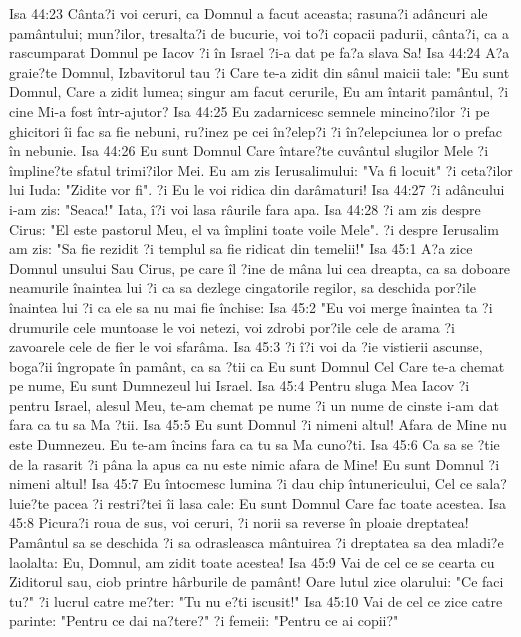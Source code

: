 Isa 44:23  Cânta?i voi ceruri, ca Domnul a facut aceasta; rasuna?i adâncuri ale pamântului; mun?ilor, tresalta?i de bucurie, voi to?i copacii padurii, cânta?i, ca a rascumparat Domnul pe Iacov ?i în Israel ?i-a dat pe fa?a slava Sa!
Isa 44:24  A?a graie?te Domnul, Izbavitorul tau ?i Care te-a zidit din sânul maicii tale: "Eu sunt Domnul, Care a zidit lumea; singur am facut cerurile, Eu am întarit pamântul, ?i cine Mi-a fost într-ajutor?
Isa 44:25  Eu zadarnicesc semnele mincino?ilor ?i pe ghicitori îi fac sa fie nebuni, ru?inez pe cei în?elep?i ?i în?elepciunea lor o prefac în nebunie.
Isa 44:26  Eu sunt Domnul Care întare?te cuvântul slugilor Mele ?i împline?te sfatul trimi?ilor Mei. Eu am zis Ierusalimului: "Va fi locuit" ?i ceta?ilor lui Iuda: "Zidite vor fi". ?i Eu le voi ridica din darâmaturi!
Isa 44:27  ?i adâncului i-am zis: "Seaca!" Iata, î?i voi lasa râurile fara apa.
Isa 44:28  ?i am zis despre Cirus: "El este pastorul Meu, el va împlini toate voile Mele". ?i despre Ierusalim am zis: "Sa fie rezidit ?i templul sa fie ridicat din temelii!"
Isa 45:1  A?a zice Domnul unsului Sau Cirus, pe care îl ?ine de mâna lui cea dreapta, ca sa doboare neamurile înaintea lui ?i ca sa dezlege cingatorile regilor, sa deschida por?ile înaintea lui ?i ca ele sa nu mai fie închise:
Isa 45:2  "Eu voi merge înaintea ta ?i drumurile cele muntoase le voi netezi, voi zdrobi por?ile cele de arama ?i zavoarele cele de fier le voi sfarâma.
Isa 45:3  ?i î?i voi da ?ie vistierii ascunse, boga?ii îngropate în pamânt, ca sa ?tii ca Eu sunt Domnul Cel Care te-a chemat pe nume, Eu sunt Dumnezeul lui Israel.
Isa 45:4  Pentru sluga Mea Iacov ?i pentru Israel, alesul Meu, te-am chemat pe nume ?i un nume de cinste i-am dat fara ca tu sa Ma ?tii.
Isa 45:5  Eu sunt Domnul ?i nimeni altul! Afara de Mine nu este Dumnezeu. Eu te-am încins fara ca tu sa Ma cuno?ti.
Isa 45:6  Ca sa se ?tie de la rasarit ?i pâna la apus ca nu este nimic afara de Mine! Eu sunt Domnul ?i nimeni altul!
Isa 45:7  Eu întocmesc lumina ?i dau chip întunericului, Cel ce sala?luie?te pacea ?i restri?tei îi lasa cale: Eu sunt Domnul Care fac toate acestea.
Isa 45:8  Picura?i roua de sus, voi ceruri, ?i norii sa reverse în ploaie dreptatea! Pamântul sa se deschida ?i sa odrasleasca mântuirea ?i dreptatea sa dea mladi?e laolalta: Eu, Domnul, am zidit toate acestea!
Isa 45:9  Vai de cel ce se cearta cu Ziditorul sau, ciob printre hârburile de pamânt! Oare lutul zice olarului: "Ce faci tu?" ?i lucrul catre me?ter: "Tu nu e?ti iscusit!"
Isa 45:10  Vai de cel ce zice catre parinte: "Pentru ce dai na?tere?" ?i femeii: "Pentru ce ai copii?"
